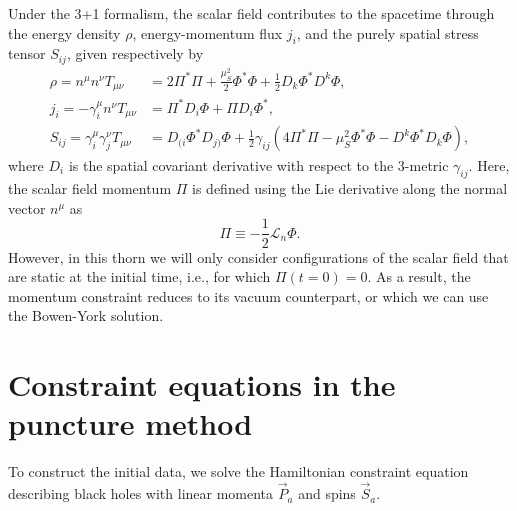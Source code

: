 
Under the 3+1 formalism,
the scalar field contributes to the spacetime through the energy density $\rho$,
energy-momentum flux $j_i$,
and the purely spatial stress tensor $S_{ij}$, given respectively by
\begin{align}
    \rho = n^\mu n^\nu T_{\mu\nu}
    &= 2 \Pi^* \Pi + \frac{\mu_S^2}{2} \Phi^* \Phi
    + \frac{1}{2} D_k\Phi^* D^k \Phi,
    \\
    j_i = -\gamma_i^\mu n^\nu T_{\mu\nu}
    &= \Pi^* D_i\Phi + \Pi D_i\Phi^*,
    \\
    S_{ij} = \gamma_i ^\mu \gamma_j^\nu T_{\mu\nu}
    &= D_{(i}\Phi^* D_{j)}\Phi
    + \frac{1}{2} \gamma_{ij}
    (4\Pi^* \Pi - \mu_S^2 \Phi^* \Phi - D^k\Phi^* D_k\Phi),
\end{align}
where $D_i$ is the spatial covariant derivative with respect to the 3-metric $\gamma_{ij}$.
Here, the scalar field momentum $\Pi$ is defined using the Lie derivative
along the normal vector $n^\mu$ as
\begin{equation}
    \Pi \equiv - \frac{1}{2} \mathcal{L}_n \Phi.
\end{equation}
However, in this thorn we will only consider configurations of the scalar field 
that are static at the initial time, i.e., for which $\Pi(t=0)=0$.
As a result, the momentum constraint reduces to its vacuum counterpart,
or which we can use the Bowen-York solution.

\section{Constraint equations in the puncture method}
To construct the initial data, we solve the Hamiltonian constraint equation
describing black holes with linear momenta $\vec{P}_a$ and spins $\vec{S}_a$.

